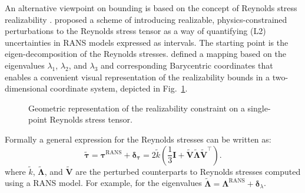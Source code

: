 \documentclass[a4paper]{ar-1col}
\begin{document}
An alternative viewpoint on bounding is based on the concept of Reynolds stress realizability \citep{schumann1977realizability, lumley1978computational, pope1985pdf, durbin1994realizability}.
 \cite{emory2011modeling,emory2013modeling} proposed a scheme of introducing 
realizable, physics-constrained perturbations to the
Reynolds stress tensor as a way of quantifying (L2) uncertainties in RANS models expressed as intervals. 
The starting point is the eigen-decomposition of the Reynolds stresses. \citet{banerjee2007presentation} defined a mapping based on  the eigenvalues $\lambda_1$, $\lambda_2$, and $\lambda_3$ and
corresponding  Barycentric coordinates that enables a convenient visual representation of the realizability bounds in a two-dimensional coordinate system,  depicted in Fig.~\ref{fig:realizable}.

\begin{figure}[!htbp]
  \centering
   \begin{floatrow}
 \end{floatrow}
 \vspace{1em}
  \caption{Geometric representation of the realizability constraint on a single-point Reynolds stress tensor.}
  \label{fig:realizable}
\end{figure}



Formally a general expression for the Reynolds stresses can be written as: 
\begin{equation}
  \widetilde{\boldsymbol{\tau}} = \boldsymbol{\tau}^{\text{RANS}} +  \boldsymbol{\delta}_{\bm{\tau}}
  = 2 \widetilde{k} \left( \frac{1}{3} \mathbf{I} + \widetilde{\mathbf{V}} \widetilde{\bm{\Lambda}} \widetilde{\mathbf{V}}^{\top} \right).
  \label{eq:eigen}
\end{equation}
where $\widetilde{k}$, $\widetilde{\bm{\Lambda}}$, and $\widetilde{\bm{V}}$ are the perturbed counterparts to Reynolds stresses computed using a RANS model.  For example, for the eigenvalues $\widetilde{\bm{\Lambda}} = \bm{\Lambda}^{\text{RANS}} + \boldsymbol{\delta}_{\lambda}$. 
\end{document}
